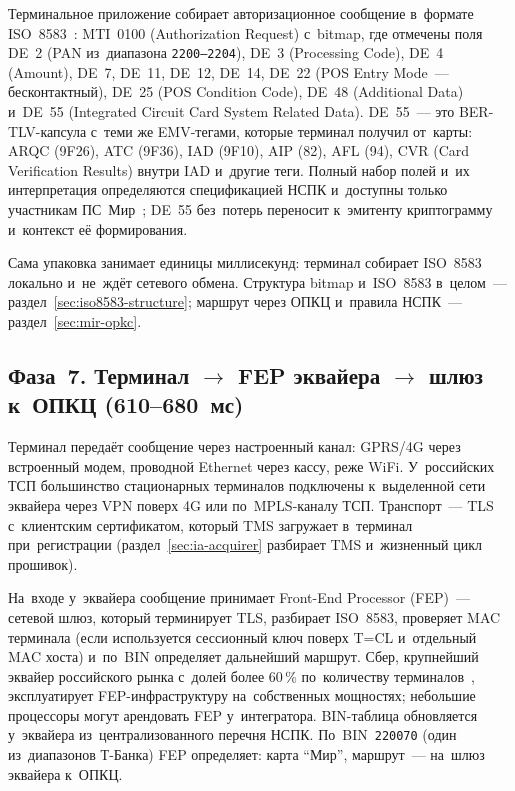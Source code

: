Терминальное приложение собирает авторизационное сообщение в~формате
ISO~8583~\cite{iso-8583-2023}: MTI~0100 (Authorization Request)
с~bitmap, где отмечены поля DE~2 (PAN из~диапазона
\texttt{2200--2204}), DE~3 (Processing Code), DE~4 (Amount), DE~7, DE~11, DE~12,
DE~14, DE~22 (POS Entry Mode~--- бесконтактный), DE~25 (POS Condition Code),
DE~48 (Additional Data) и~DE~55 (Integrated Circuit Card System Related Data).
DE~55~--- это BER-TLV-капсула с~теми же EMV-тегами, которые терминал получил
от~карты: ARQC
(9F26), ATC (9F36), IAD (9F10), AIP (82), AFL (94), CVR (Card Verification
Results) внутри IAD и~другие теги.
Полный набор полей и~их интерпретация определяются спецификацией НСПК и~доступны
только участникам ПС~Мир~\cite{nspk-about-company}; DE~55 без~потерь переносит
к~эмитенту криптограмму и~контекст её формирования.

Сама упаковка занимает единицы миллисекунд: терминал собирает ISO~8583 локально
и~не~ждёт сетевого обмена.
Структура bitmap и~ISO~8583 в~целом~--- раздел~\ref{sec:iso8583-structure};
маршрут через ОПКЦ и~правила НСПК~--- раздел~\ref{sec:mir-opkc}.

\subsection*{Фаза~7. Терминал \ensuremath{\rightarrow} FEP эквайера \ensuremath{\rightarrow} шлюз к~ОПКЦ (610--680~мс)}

Терминал передаёт сообщение через настроенный канал:
GPRS/4G через встроенный модем, проводной Ethernet через кассу, реже WiFi.
У~российских ТСП большинство стационарных терминалов подключены к~выделенной
сети эквайера через VPN поверх 4G или по~MPLS-каналу ТСП. Транспорт~--- TLS
с~клиентским сертификатом, который TMS загружает в~терминал при~регистрации
(раздел~\ref{sec:ia-acquirer} разбирает TMS и~жизненный цикл прошивок).

На~входе у~эквайера сообщение принимает Front-End Processor (FEP)~--- сетевой
шлюз, который терминирует TLS, разбирает ISO~8583, проверяет MAC терминала
(если используется сессионный ключ поверх T=CL и~отдельный MAC хоста) и~по~BIN
определяет дальнейший маршрут. Сбер, крупнейший эквайер российского рынка
с~долей более 60\,\% по~количеству терминалов~\cite{bosfera-sber-acquiring,comnews-sber-acquirer-2025},
эксплуатирует FEP-инфраструктуру на~собственных мощностях; небольшие процессоры
могут арендовать FEP у~интегратора. BIN-таблица обновляется у~эквайера
из~централизованного перечня НСПК. По~BIN~\texttt{220070} (один из~диапазонов
Т-Банка) FEP определяет: карта \enquote{Мир}, маршрут~--- на~шлюз эквайера к~ОПКЦ.

